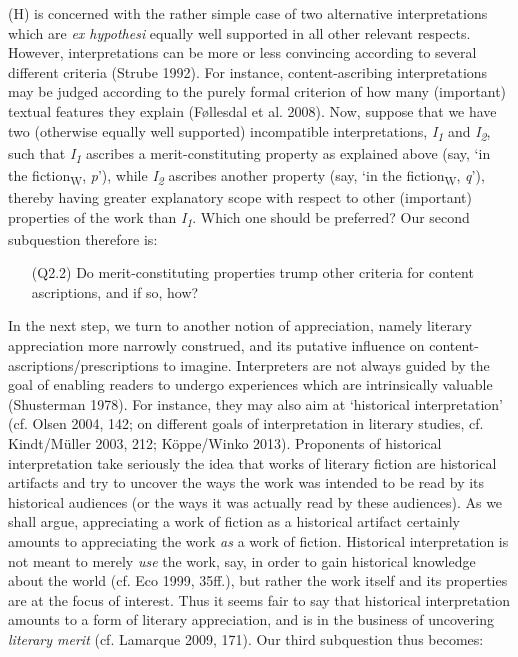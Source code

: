 \noindent (H) is concerned with the rather simple case of two alternative interpretations which are \emph{ex hypothesi} equally well supported in all other relevant respects. However, interpretations can be more or less convincing according to several different criteria (Strube 1992). For instance, content-ascribing interpretations may be judged according to the purely formal criterion of how many (important) textual features they explain (F\o{}llesdal et al. 2008). Now, suppose that we have two (otherwise equally well supported) incompatible interpretations, \emph{I\textsubscript{1}} and \emph{I\textsubscript{2}}, such that \emph{I\textsubscript{1}} ascribes a merit-constituting property as explained above (say, `in the fiction\textsubscript{W}, \emph{p}'), while \emph{I\textsubscript{2}} ascribes another property (say, `in the fiction\textsubscript{W}, \emph{q}'), thereby having greater explanatory scope with respect to other (important) properties of the work than \emph{I\textsubscript{1}}. Which one should be preferred? Our second subquestion therefore is:

\vspace{-.1cm}
\begin{itemize}[leftmargin=2cm]
\item[(Q2.2)] Do merit-constituting properties trump other criteria for content ascriptions, and if so, how?
\end{itemize}
\vspace{-.1cm}

\noindent In the next step, we turn to another notion of appreciation, namely literary appreciation more narrowly construed, and its putative influence on content-ascriptions/prescriptions to imagine. Interpreters are not always guided by the goal of enabling readers to undergo experiences which are intrinsically valuable (Shusterman 1978). For instance, they may also aim at `historical interpretation' (cf. Olsen 2004, 142; on different goals of interpretation in literary studies, cf. Kindt/M\"uller 2003, 212; K\"oppe/Winko 2013). Proponents of historical interpretation take seriously the idea that works of literary fiction are historical artifacts and try to uncover the ways the work was intended to be read by its historical audiences (or the ways it was actually read by these audiences). As we shall argue, appreciating a work of fiction as a historical artifact certainly amounts to appreciating the work \emph{as} a work of fiction. Historical interpretation is not meant to merely \emph{use} the work, say, in order to gain historical knowledge about the world (cf. Eco 1999, 35ff.), but rather the work itself and its properties are at the focus of interest. Thus it seems fair to say that historical interpretation amounts to a form of literary appreciation, and is in the business of uncovering \emph{literary merit} (cf. Lamarque 2009, 171). Our third subquestion thus becomes:

